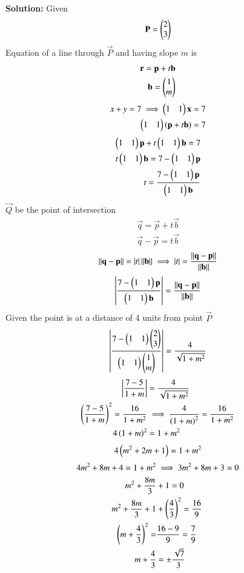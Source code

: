 \documentclass[journal]{IEEEtran}
\begin{document}
\textbf{Solution:}  
Given  
\begin{align}
\mathbf{P}=\begin{pmatrix}2\\3\end{pmatrix}
\end{align}
Equation of a line through $\vec{P}$ and having slope $m$ is
\begin{align}
\mathbf{r}=\mathbf{p}+t\mathbf{b} \\
\mathbf{b}=\begin{pmatrix}1\\m\end{pmatrix}
 \end{align}
\begin{align}
  x+y=7 \implies  \begin{pmatrix}1 & 1\end{pmatrix}\mathbf{x}=7 \\
  \begin{pmatrix}1&1\end{pmatrix}\left(\mathbf{p}+t\mathbf{b}\right)=7
\end{align}
\begin{align}
\begin{pmatrix}1&1\end{pmatrix}\mathbf{p}+t\begin{pmatrix}1&1\end{pmatrix}\mathbf{b} = 7\\
t\begin{pmatrix}1&1\end{pmatrix}\mathbf{b} =7-\begin{pmatrix}1&1\end{pmatrix}\mathbf{p} \\
t=\frac{7-\begin{pmatrix}1&1\end{pmatrix}\mathbf{p}}{\begin{pmatrix}1&1\end{pmatrix}\mathbf{b}}
\end{align}
$\vec{Q}$ be the point of intersection
\begin{align}
\vec{q}=\vec{p}+t\vec{b} \\
\vec{q}-\vec{p}=t\vec{b} 
\end{align}
\begin{align}
\left\lVert\mathbf{q}-\mathbf{p}\right\rVert=|t|\left\lVert\mathbf{b}\right\rVert 
\implies |t|=\frac{\left\lVert\mathbf{q}-\mathbf{p}\right\rVert}{\left\lVert\mathbf{b}\right\rVert} 
\end{align}
\begin{align}
\left|  \frac{7-\begin{pmatrix}1&1\end{pmatrix}\mathbf{p}}{\begin{pmatrix}1&1\end{pmatrix}\mathbf{b}} \right|=\frac{\left\lVert\mathbf{q}-\mathbf{p}\right\rVert}{\left\lVert\mathbf{b}\right\rVert}
\end{align}
Given the point is at a distance of 4 units from point $\vec{P}$
\begin{align}
 \left|  \frac{7-\begin{pmatrix}1&1\end{pmatrix}\begin{pmatrix}2\\3\end{pmatrix}}{\begin{pmatrix}1&1\end{pmatrix}\begin{pmatrix}1\\m\end{pmatrix}} \right| =\frac{4}{\sqrt{1+m^2}} 
\end{align}
\begin{align}
\left|\frac{7-5}{1+m}\right|&=\frac{4}{\sqrt{1+m^2}} \\
\left(\frac{7-5}{1+m}\right)^2=\frac{16}{1+m^2} &\implies \frac{4}{\left(1+m\right)^2}=\frac{16}{1+m^2} \\
4\left(1+m\right)^2&=1+m^2 
\end{align}
\begin{align}
4\left(m^2+2m+1\right)=1+m^2 
\end{align}
\begin{align}
4m^2+8m+4=1+m^2 &\implies 3m^2 + 8m + 3 = 0 \\
m^2 +\frac{8m}{3}& + 1 = 0 \\
m^2 +\frac{8m}{3} + 1 &+\left(\frac{4}{3}\right)^2= \frac{16}{9} \\
\left(m+\frac{4}{3}\right)^2=&\frac{16-9}{9}=\frac{7}{9} \\
m+\frac{4}{3}&=\pm\frac{\sqrt{7}}{3}
\end{align}
\end{document}
